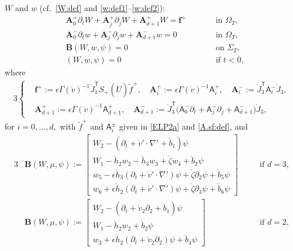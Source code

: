 \documentclass[twoside,11pt]{article}
\numberwithin{equation}{section}
\def\p{\partial}
\begin{document}
	$W$ and $w$ (cf.~\eqref{W:def} and \eqref{w:def1}--\eqref{w:def2}):
	\begin{subequations}
		\label{ELP4}
		\begin{alignat}{3}
			\label{ELP4a}
			& {\bm{A}}_0^+\p_tW  +{ \bm{A}}_j^+\p_jW +{ \bm{A}}_{d+1}^+ W = \bm{f}^+
			&\qquad  &\textrm{in }\Omega_T,\\
			\label{ELP4b}
			& { \bm{A}}_0^-\p_tw  +{ \bm{A}}_j^-\p_j w    +{ \bm{A}}_{d+1}^-  w =0
			&&\textrm{in }\Omega_T,\\
			\label{ELP4c}
&\bm{B}(W,w,\psi)=0
&&\textrm{on }\Sigma_T,\\			
			\label{ELP4d}
			&
			(W,w, \psi) =0
			&& \textrm{if } t<0,
		\end{alignat}
	\end{subequations}
where
	\begin{alignat}{3} \label{A.bm:def}
\left\{
\begin{aligned}
	&	\bm{f}^+:=\epsilon\varGamma(\mathring{v})^{-1}\mathring{J}_1^{\mathsf{T}}S_+(\mathring{U})\tilde{f}^+, \quad
\bm{A}_i^+:=\epsilon\varGamma(\mathring{v})^{-1}\mathsf{A}_i^+,\quad
\bm{A}_i^-:=\mathring{J}_3^{\mathsf{T}}\mathsf{A}_i^-\mathring{J}_3,
\\
&		\bm{A}_{d+1}^+:=\epsilon\varGamma(\mathring{v})^{-1}\mathsf{A}_{d+1}^+,\quad	
\bm{A}_{d+1}^-:=\mathring{J}_3^{\mathsf{T}}\big({\mathsf{A}}_0^-\p_t  +{\mathsf{A}}_j^-\p_j   +{\mathsf{A}}_{d+1}^-\big)\mathring{J}_3, 	
\end{aligned}		
\right.
\end{alignat}
for $i=0,\ldots,d,$
with $\tilde{f}^+$  and $\mathsf{A}_i^{\pm}$ given in  \eqref{ELP2a} and \eqref{A.sf:def}, and
\begin{alignat}{3}
\label{B.bm3D:def}	
	&\bm{B}(W,\mu, \psi)	
	:=\begin{bmatrix}
		W_2-(\p_t+\mathring{v}'\cdot\nabla'+\mathring{b}_1)\psi\\[1mm]				
		W_1-\mathring{{h}}_2 w_2-\mathring{{h}}_3 w_3+\mathring{\zeta} w_4
		+\mathring{b}_2 \psi\\[1mm]
		w_5-\epsilon \mathring{h}_3 (\p_t+\mathring{v}'\cdot\nabla')\psi
		+\mathring{\zeta} \p_2\psi
		+\mathring{b}_5 \psi \\[1mm]
		w_6+\epsilon \mathring{h}_2 (\p_t+\mathring{v}'\cdot\nabla') \psi+\mathring{\zeta} \p_3\psi
		+\mathring{b}_6\psi
	\end{bmatrix}\quad
	&&	\textrm{if }d=3,\\[1mm]
	&\bm{B}(W,\mu, \psi)	
	:=\begin{bmatrix}
		W_2-(\p_t+\mathring{v}_2\p_2 +\mathring{b}_1)\psi\\[1mm]				
		W_1-\mathring{{h}}_2 w_2 +\mathring{b}_2 \psi\\[1mm]
		w_3+\epsilon \mathring{h}_2 (\p_t+\mathring{v}_2\p_2)\psi+\mathring{b}_4\psi
	\end{bmatrix}\quad
	&&	\textrm{if }d=2,
\label{B.bm2D:def}		
\end{alignat}
\end{document}
